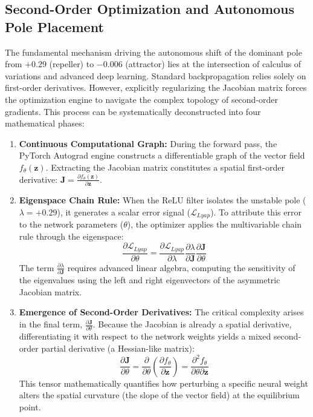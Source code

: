 \documentclass[12pt, a4paper]{article}
\begin{document}
	\subsection{Second-Order Optimization and Autonomous Pole Placement}
	
	The fundamental mechanism driving the autonomous shift of the dominant pole from $+0.29$ (repeller) to $-0.006$ (attractor) lies at the intersection of calculus of variations and advanced deep learning. Standard backpropagation relies solely on first-order derivatives. However, explicitly regularizing the Jacobian matrix forces the optimization engine to navigate the complex topology of second-order gradients. This process can be systematically deconstructed into four mathematical phases:
	
	\begin{enumerate}
		\item \textbf{Continuous Computational Graph:} During the forward pass, the PyTorch Autograd engine constructs a differentiable graph of the vector field $f_\theta(\mathbf{z})$. Extracting the Jacobian matrix constitutes a spatial first-order derivative: $\mathbf{J} = \frac{\partial f_\theta(\mathbf{z})}{\partial \mathbf{z}}$.
		
		\item \textbf{Eigenspace Chain Rule:} When the ReLU filter isolates the unstable pole ($\lambda = +0.29$), it generates a scalar error signal ($\mathcal{L}_{Lyap}$). To attribute this error to the network parameters ($\theta$), the optimizer applies the multivariable chain rule through the eigenspace:
		$$ \frac{\partial \mathcal{L}_{Lyap}}{\partial \theta} = \frac{\partial \mathcal{L}_{Lyap}}{\partial \lambda} \frac{\partial \lambda}{\partial \mathbf{J}} \frac{\partial \mathbf{J}}{\partial \theta} $$
		The term $\frac{\partial \lambda}{\partial \mathbf{J}}$ requires advanced linear algebra, computing the sensitivity of the eigenvalues using the left and right eigenvectors of the asymmetric Jacobian matrix.
		
		\item \textbf{Emergence of Second-Order Derivatives:} The critical complexity arises in the final term, $\frac{\partial \mathbf{J}}{\partial \theta}$. Because the Jacobian is already a spatial derivative, differentiating it with respect to the network weights yields a mixed second-order partial derivative (a Hessian-like matrix):
		$$ \frac{\partial \mathbf{J}}{\partial \theta} = \frac{\partial}{\partial \theta} \left( \frac{\partial f_\theta}{\partial \mathbf{z}} \right) = \frac{\partial^2 f_\theta}{\partial \theta \partial \mathbf{z}} $$
		This tensor mathematically quantifies how perturbing a specific neural weight alters the spatial curvature (the slope of the vector field) at the equilibrium point.
		

\end{enumerate}
\end{document}
